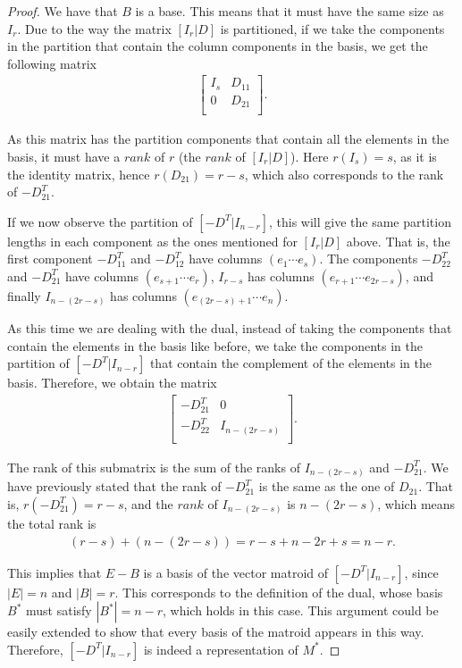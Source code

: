 \begin{proof}
    We have that $B$ is a base. This means that it must have the same size as $I_r$. Due to the way the matrix $[I_r|D]$ is partitioned, if we take the components in the partition that contain the column components in the basis, we get the following matrix
        \begin{align*}
        \begin{bmatrix}
        I_s & D_{11}\\
        0 & D_{21}\\
        \end{bmatrix}.
        \end{align*}

    As this matrix has the partition components that contain all the elements in the basis, it must have a $rank$ of $r$ (the $rank$ of $[I_r|D]$). Here $r(I_s) = s$, as it is the identity matrix, hence $r(D_{21})=r-s$, which also corresponds to the rank of $-D_21^T$.
    
    If we now observe the partition of $[-D^T|I_{n-r}]$, this will give the same partition lengths in each component as the ones mentioned for $[I_r|D]$ above. That is, the first component $-D_{11}^T$ and $-D_{12}^T$ have columns $(e_1 \cdots e_s)$. The components $-D_{22}^T$ and $-D_{21}^T$ have columns $(e_{s+1} \cdots e_r)$, $I_{r-s}$ has columns $(e_{r+1} \cdots e_{2r-s})$, and finally $ I_{n-(2r-s)}$ has columns $(e_{(2r-s)+1} \cdots e_n)$.

    As this time we are dealing with the dual, instead of taking the components that contain the elements in the basis like before, we take the components in the partition of $[-D^T|I_{n-r}]$ that contain the complement of the elements in the basis. Therefore, we obtain the matrix
    \begin{align*}
        \begin{bmatrix}
        -D_{21}^T & 0\\
        -D_{22}^T & I_{n-(2r-s)}\\
        \end{bmatrix}.
    \end{align*}

   The rank of this submatrix is the sum of the ranks of $I_{n-(2r-s)}$ and $-D_{21}^T$. We have previously stated that the rank of $-D_{21}^T$ is the same as the one of $D_{21}$. That is, $r(-D_{21}^T)= r-s$, and the $rank$ of $I_{n-(2r-s)}$ is $n-(2r-s)$, which means the total rank is 
   \begin{align*}
    (r-s)+(n-(2r-s))= r-s+n-2r+s = n-r.
   \end{align*}

    This implies that $E-B$ is a basis of the vector matroid of $[-D^T|I_{n-r}]$, since $|E|= n$ and $|B|= r$. This corresponds to the definition of the dual, whose basis $B^*$ must satisfy $|B^*|= n-r$, which holds in this case. This argument could be easily extended to show that every basis of the matroid appears in this way. Therefore, $[-D^T|I_{n-r}]$ is indeed a representation of $M^*$.
\end{proof}

